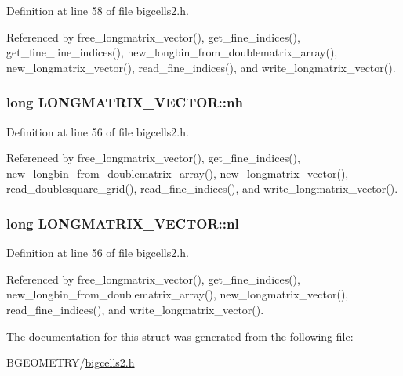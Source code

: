 Definition at line 58 of file bigcells2.\-h.



Referenced by free\-\_\-longmatrix\-\_\-vector(), get\-\_\-fine\-\_\-indices(), get\-\_\-fine\-\_\-line\-\_\-indices(), new\-\_\-longbin\-\_\-from\-\_\-doublematrix\-\_\-array(), new\-\_\-longmatrix\-\_\-vector(), read\-\_\-fine\-\_\-indices(), and write\-\_\-longmatrix\-\_\-vector().

\hypertarget{struct_l_o_n_g_m_a_t_r_i_x___v_e_c_t_o_r_a47a229640d2bcb1b679b21c154b13364}{
\subsubsection[{nh}]{\setlength{\rightskip}{0pt plus 5cm}long L\-O\-N\-G\-M\-A\-T\-R\-I\-X\-\_\-\-V\-E\-C\-T\-O\-R\-::nh}}\label{struct_l_o_n_g_m_a_t_r_i_x___v_e_c_t_o_r_a47a229640d2bcb1b679b21c154b13364}


Definition at line 56 of file bigcells2.\-h.



Referenced by free\-\_\-longmatrix\-\_\-vector(), get\-\_\-fine\-\_\-indices(), new\-\_\-longbin\-\_\-from\-\_\-doublematrix\-\_\-array(), new\-\_\-longmatrix\-\_\-vector(), read\-\_\-doublesquare\-\_\-grid(), read\-\_\-fine\-\_\-indices(), and write\-\_\-longmatrix\-\_\-vector().

\hypertarget{struct_l_o_n_g_m_a_t_r_i_x___v_e_c_t_o_r_a465020e51cc8a7ea86bbb098ea2bbba9}{
\subsubsection[{nl}]{\setlength{\rightskip}{0pt plus 5cm}long L\-O\-N\-G\-M\-A\-T\-R\-I\-X\-\_\-\-V\-E\-C\-T\-O\-R\-::nl}}\label{struct_l_o_n_g_m_a_t_r_i_x___v_e_c_t_o_r_a465020e51cc8a7ea86bbb098ea2bbba9}


Definition at line 56 of file bigcells2.\-h.



Referenced by free\-\_\-longmatrix\-\_\-vector(), get\-\_\-fine\-\_\-indices(), new\-\_\-longbin\-\_\-from\-\_\-doublematrix\-\_\-array(), new\-\_\-longmatrix\-\_\-vector(), read\-\_\-fine\-\_\-indices(), and write\-\_\-longmatrix\-\_\-vector().



The documentation for this struct was generated from the following file\-:\begin{DoxyCompactItemize}
\item 
B\-G\-E\-O\-M\-E\-T\-R\-Y/\hyperlink{bigcells2_8h}{bigcells2.\-h}\end{DoxyCompactItemize}
